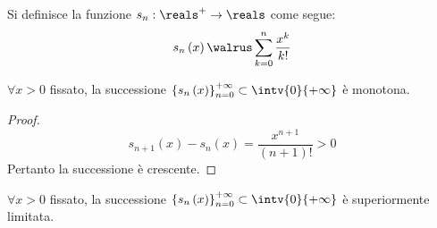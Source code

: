 Si definisce la funzione $s_n:\reals^+\to\reals$ come segue:
$$s_n\left( x \right)\walrus\sum_{k=0}^n\frac{x^k}{k!}$$

\begin{theorem}
  $\forall x>0$ fissato, la successione $\left\{ s_n\left( x \right) \right\}_{n=0}^{+\infty}\subset\intv{0}{+\infty}$ è monotona.
\end{theorem}
\begin{proof}
  $$s_{n+1}\left( x \right)-s_n\left( x \right)=\frac{x^{n+1}}{\left( n+1 \right)!}>0$$
  Pertanto la successione è crescente.
\end{proof}

\begin{theorem}
  $\forall x>0$ fissato, la successione $\left\{ s_n\left( x \right) \right\}_{n=0}^{+\infty}\subset\intv{0}{+\infty}$ è superiormente limitata.
\end{theorem}
